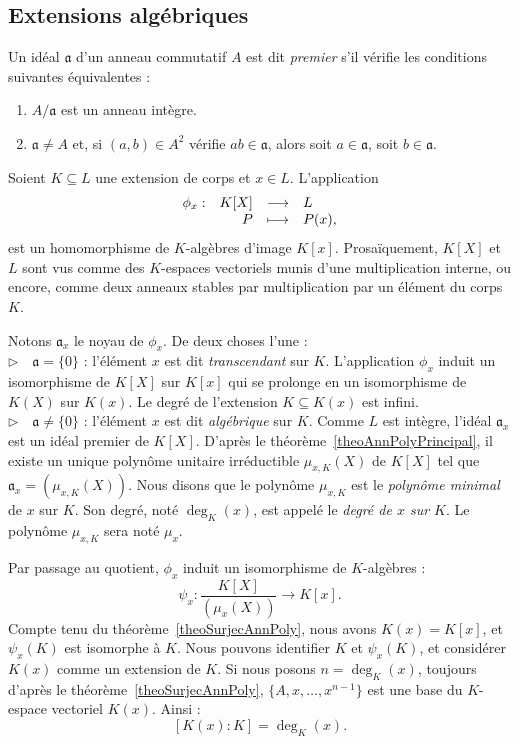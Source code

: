 \documentclass[a4paper, titlepage]{article}
\theoremstyle{definition}
\theoremstyle{remark}
\begin{document}
\subsection{Extensions algébriques}
Un idéal $\mathfrak{a}$ d'un anneau commutatif $A$ est dit \textit{premier} s'il vérifie les conditions suivantes équivalentes : \begin{enumerate}
\item $A/\mathfrak{a}$ est un anneau intègre.
\item $\mathfrak{a} \neq A$ et, si $(a, b) \in A^2$ vérifie $ab \in \mathfrak{a}$, alors soit $a\in \mathfrak{a}$, soit $b\in\mathfrak{a}$.
\end{enumerate}

Soient $K \subseteq L$ une extension de corps et $x \in L$. L'application 
$$\begin{array}{r r c l}
 \phi_x :& K[X]& \longrightarrow& L \\
 & P& \longmapsto& P(x),
\end{array}$$
est un homomorphisme de $K$-algèbres d'image $K[x]$. Prosaïquement, $K[X]$ et $L$ sont vus comme des $K$-espaces vectoriels munis d'une multiplication interne, ou encore, comme deux anneaux stables par multiplication par un élément du corps $K$.

Notons $\mathfrak{a}_x$ le noyau de $\phi_x$. De deux choses l'une :
\\$\triangleright\quad\mathfrak{a} = \{0\}$ : l'élément $x$ est dit \textit{transcendant} sur $K$. L'application $\phi_x$ induit un isomorphisme de $K[X]$ sur $K[x]$ qui se prolonge en un isomorphisme de $K(X)$ sur $K(x)$. Le degré de l'extension $K \subseteq K(x)$ est infini.
\\$\triangleright\quad\mathfrak{a} \neq \{0\}$ : l'élément $x$ est dit \textit{algébrique} sur $K$. Comme $L$ est intègre, l'idéal $\mathfrak{a}_x$ est un idéal premier de $K[X]$. D'après le théorème~\ref{theoAnnPolyPrincipal}, il existe un unique polynôme unitaire irréductible $\mu_{x,K}(X)$ de $K[X]$ tel que $\mathfrak{a}_x = (\mu_{x,K}(X))$. Nous disons que le polynôme $\mu_{x,K}$ est le \textit{polynôme minimal} de $x$ sur $K$. Son degré, noté $\deg_K(x)$, est appelé le \textit{degré de $x$ sur $K$}. Le polynôme $\mu_{x,K}$ sera noté $\mu_x$.

Par passage au quotient, $\phi_x$ induit un isomorphisme de $K$-algèbres :
$$\psi_x : \frac{K[X]}{(\mu_x(X))} \longrightarrow K[x].$$
Compte tenu du théorème~\ref{theoSurjecAnnPoly}, nous avons $K(x) = K[x]$, et $\psi_x(K)$ est isomorphe à $K$. Nous pouvons identifier $K$ et $\psi_x(K)$, et considérer $K(x)$ comme un extension de $K$. Si nous posons $n = \deg_K(x)$, toujours d'après le théorème~\ref{theoSurjecAnnPoly}, $\{A,x,\dots,x^{n-1}\}$ est une base du $K$-espace vectoriel $K(x)$. Ainsi : $$[K(x) : K] = \deg_K(x).$$
\end{document}
